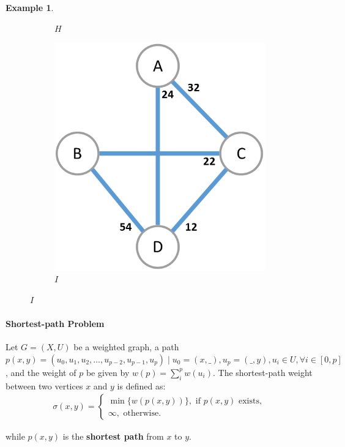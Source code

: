 \documentclass[12pt]{article}
\newtheorem{example}{Example}[section]
\begin{document}
\begin{example}
\begin{figure}[H]
\begin{subfigure}{.33\linewidth}
			\caption{$H$}
			\label{fig:example-graph-nn}
		\end{subfigure}%
		\begin{subfigure}{.33\linewidth}
			\centering
			\includegraphics[width=.8\linewidth]{example-graph-en}
			\caption{$I$}
			\label{fig:example-graph-en}
		\end{subfigure}
	\end{figure}
\end{example}

\paragraph{Shortest-path Problem \cite{cor2011}}

Let $G=(X, U)$ be a weighted graph, a path $p(x, y)=(u_0, u_1, u_2, \dots, u_{p-2}, u_{p-1}, u_{p}) \mid u_0 = (x, \_), u_p = (\_, y), u_i \in U, \forall i \in [0, p]$, and the weight of $p$ be given by $w(p) = \sum_i^p w(u_i)$. The shortest-path weight between two vertices $x$ and $y$ is defined as:
\begin{align*}
	\sigma(x, y) = \begin{cases}
		\min \{w(p(x, y))\}, \text{ if $p(x, y)$ exists}, \\
		\infty, \text{ otherwise.}
	\end{cases}
\end{align*}

while $p(x, y)$ is the \textbf{shortest path} from $x$ to $y$.
\end{document}
